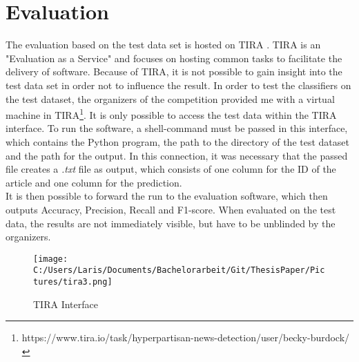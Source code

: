 \documentclass[a4paper, 11pt,titlepage,oneside,openany]{book}
\begin{document}
\chapter{Evaluation}
The evaluation based on the test data set is hosted on TIRA \cite{tira}. TIRA is an "Evaluation as a Service" \cite{evaluationasaservice} and focuses on hosting common tasks to facilitate the delivery of software. Because of TIRA, it is not possible to gain insight into the test data set in order not to influence the result.
In order to test the classifiers on the test dataset, the organizers of the competition provided me with a virtual machine in TIRA\footnote{https://www.tira.io/task/hyperpartisan-news-detection/user/becky-burdock/}. It is only possible to access the test data within the TIRA interface. To run the software, a shell-command must be passed in this interface, which contains the Python program, the path to the directory of the test dataset and the path for the output. In this connection, it was necessary that the passed file creates a \textit{.txt} file as output, which consists of one column for the ID of the article and one column for the prediction. \\
\indent It is then possible to forward the run to the evaluation software, which then outputs Accuracy, Precision, Recall and F1-score. When evaluated on the test data, the results are not immediately visible, but have to be unblinded by the organizers. 
\begin{figure}[h]
	\centering
	\texttt{[image: C:/Users/Laris/Documents/Bachelorarbeit/Git/ThesisPaper/Pictures/tira3.png]}
	\caption{TIRA Interface}
\end{figure}
\end{document}
